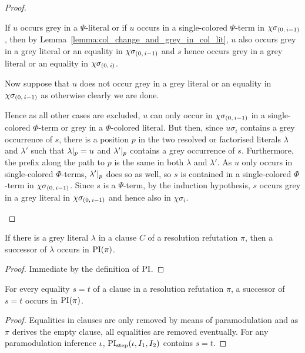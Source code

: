 \documentclass[,%
	draft=false,%
	numbers=noendperiod
	12pt,
	a4paper,
	oneside,%
	openany,
]{memoir}
\newcommand{\inv}{\ensuremath{\chi}}
\begin{document}
\begin{proof}
\begin{itemize}
			If $u$ occurs grey in a $\Psi$-literal or
			if $u$ occurs in a single-colored $\Psi$-term in $\inv\sigmazmi$, then by Lemma~\ref{lemma:col_change_and_grey_in_col_lit}, $u$ also occurs grey in a grey literal or an equality in $\inv\sigmazmi$ and $s$ hence occurs grey in a grey literal or an equality in $\inv\sigmazi$. 

			Now suppose that $u$ does not occur grey in a grey literal or an equality in $\inv\sigmazmi$ as otherwise clearly we are done.

			Hence as all other cases are excluded, $u$ can only occur in $\inv\sigmazmi$ in a single-colored $\Phi$-term or grey in a $\Phi$-colored literal.
			But then, 
			since $u\sigma_i$ contains a grey occurrence of $s$, there is a position $p$ in the two resolved or factorised literals $\lambda$ and $\lambda'$ such that $\lambda|_{p} = u$ and $\lambda'|_{p}$ contains a grey occurrence of $s$.
			Furthermore, the prefix along the path to $p$ is the same in both $\lambda$ and $\lambda'$.
			As $u$ only occurs in single-colored $\Phi$-terms, $\lambda'|_{p}$ does so as well, so $s$ is contained in a single-colored $\Phi$-term in $\inv\sigmazmi$.
			Since $s$ is a $\Psi$-term, by the induction hypothesis, $s$ occurs grey in a grey literal in $\inv\sigmazmi$ and hence also in $\inv\sigma_i$.
			\qedhere
	\end{itemize}

\end{proof}

\begin{lemma}
	\label{lemma:grey_lits_all_in_PI}
	If there is a grey literal $\lambda$ in a clause $C$ of a resolution refutation $\pi$,
	then a successor of $\lambda$ occurs in $\operatorname{PI}(\pi)$.
\end{lemma}
\begin{proof}
	Immediate by the definition of $\operatorname{PI}$.
\end{proof}

\begin{lemma}
	\label{lemma:equalities_all_in_PI}
	For every equality $s=t$ of a clause in a resolution refutation $\pi$,
	a successor of $s=t$ occurs in $\operatorname{PI}(\pi)$.
\end{lemma}
\begin{proof}
	Equalities in clauses are only removed by means of paramodulation and as $\pi$ derives the empty clause, all equalities are removed eventually.
	For any paramodulation inference $\iota$, $\operatorname{PI}_{\mathrm{step}}(\iota, I_1, I_2)$ contains $s=t$.
\end{proof}
\end{document}
